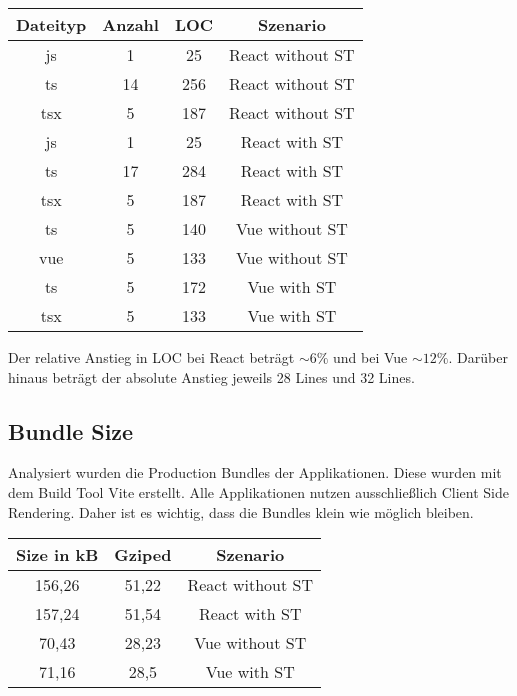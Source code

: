 \begin{center}
  \begin{tabular}{|c|c|c|c|} 
   \hline
   Dateityp & Anzahl & LOC & Szenario \\ [0.5ex] 
   \hline\hline
   js & 1 & 25 & React without ST \\ 
   \hline
   ts & 14 & 256 & React without ST \\
   \hline
   tsx & 5 & 187 & React without ST \\
   \hline\hline
   js & 1 & 25 & React with ST \\ 
   \hline
   ts & 17 & 284 & React with ST \\
   \hline
   tsx & 5 & 187 & React with ST \\
   \hline\hline
   ts & 5 & 140 & Vue without ST \\
   \hline
   vue & 5 & 133 & Vue without ST \\
   \hline\hline
   ts & 5 & 172 & Vue with ST \\
   \hline
   tsx & 5 & 133 & Vue with ST \\
   \hline
  \end{tabular}
\end{center}

Der relative Anstieg in LOC bei React beträgt $\sim6\%$ und bei Vue $\sim12\%$. Darüber hinaus beträgt der absolute Anstieg jeweils 28 Lines und 32 Lines.

\subsection{Bundle Size}

Analysiert wurden die Production Bundles der Applikationen. Diese wurden mit dem Build Tool Vite erstellt. Alle Applikationen nutzen ausschließlich Client Side Rendering. Daher ist es wichtig, dass die Bundles klein wie möglich bleiben.

\begin{center}
  \begin{tabular}{|c|c|c|} 
   \hline
   Size in kB & Gziped & Szenario \\ [0.5ex]
   \hline\hline
   156,26 & 51,22 & React without ST \\
   \hline
   157,24 & 51,54 & React with ST \\
   \hline
   70,43 & 28,23 & Vue without ST \\
   \hline
   71,16 & 28,5 & Vue with ST \\
   \hline
  \end{tabular}
\end{center}

